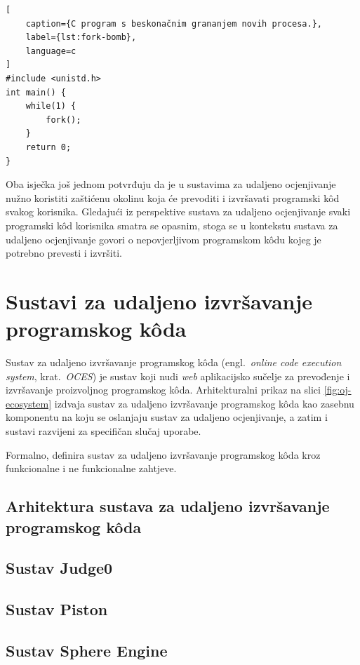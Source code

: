 \documentclass[times, utf8, diplomski]{fer}
\begin{document}
\begin{lstlisting}[
    caption={C program s beskonačnim grananjem novih procesa.},
    label={lst:fork-bomb},
    language=c
]
#include <unistd.h>
int main() {
    while(1) {
        fork();
    }
    return 0;
}
\end{lstlisting}

Oba isječka još jednom potvrđuju da je u sustavima za udaljeno ocjenjivanje nužno koristiti zaštićenu okolinu koja će prevoditi i izvršavati programski kôd svakog korisnika. Gledajući iz perspektive sustava za udaljeno ocjenjivanje svaki programski kôd korisnika smatra se opasnim, stoga se u kontekstu sustava za udaljeno ocjenjivanje govori o nepovjerljivom programskom kôdu  kojeg je potrebno prevesti i izvršiti.

\section{Sustavi za udaljeno izvršavanje programskog kôda}
Sustav za udaljeno izvršavanje programskog kôda (engl.\ \textit{online code execution system}, krat.\ \textit{OCES}) je sustav koji nudi \textit{web} aplikacijsko sučelje  za prevođenje i izvršavanje proizvoljnog programskog kôda. Arhitekturalni prikaz na slici \ref{fig:oj-ecosystem} izdvaja sustav za udaljeno izvršavanje programskog kôda kao zasebnu komponentu na koju se oslanjaju sustav za udaljeno ocjenjivanje, a zatim i sustavi razvijeni za specifičan slučaj uporabe.

Formalno, \citep{9245310} definira sustav za udaljeno izvršavanje programskog kôda kroz funkcionalne i ne funkcionalne zahtjeve.

\subsection{Arhitektura sustava za udaljeno izvršavanje programskog kôda}
\subsection{Sustav Judge0}
\subsection{Sustav Piston}
\subsection{Sustav Sphere Engine}
\end{document}
